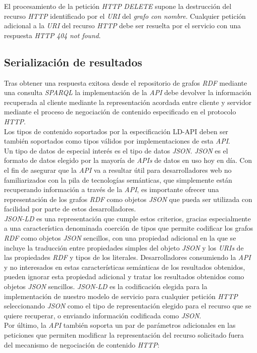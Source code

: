 El procesamiento de la petici\'on \textit{HTTP} \textit{DELETE} supone la destrucci\'on del recurso \textit{HTTP} identificado por el \textit{URI} del \textit{grafo con nombre}. Cualquier petici\'on adicional a la \textit{URI} del recurso \textit{HTTP} debe ser resuelta por el servicio con una respuesta \textit{HTTP} \textit{404 not found}.

\subsection{Serializaci\'on de resultados}

Tras obtener una respuesta exitosa desde el repositorio de grafos \textit{RDF} mediante una consulta \textit{SPARQL} la implementaci\'on de la \textit{API} debe devolver la informaci\'on recuperada al cliente mediante la representaci\'on acordada entre cliente y servidor mediante el proceso de negociaci\'on de contenido especificado en el protocolo \textit{HTTP}.\\
Los tipos de contenido soportados por la especificaci\'on LD-API deben ser tambi\'en soportados como tipos v\'alidos por implementaciones de esta \textit{API}.\\
Un tipo de datos de especial inter\'es es el tipo de datos \textit{JSON}. \textit{JSON} es el formato de datos elegido por la mayor\'ia de \textit{APIs} de datos en uso hoy en d\'ia. Con el fin de asegurar que la \textit{API} va a resultar \'util para desarrolladores web no familiarizados con la pila de tecnolog\'ias sem\'anticas, que simplemente est\'an recuperando informaci\'on a trav\'es de la \textit{API}, es importante ofrecer una representaci\'on de los grafos \textit{RDF} como objetos \textit{JSON} que pueda ser utilizada con facilidad por parte de estos desarrolladores.\\
\textit{JSON-LD} \cite{jsonld} es una representaci\'on que cumple estos criterios, gracias especialmente a una caracter\'istica denominada coerci\'on de tipos que permite codificar los grafos \textit{RDF} como objetos \textit{JSON} sencillos, con una propiedad adicional en la que se incluye la traducci\'on entre propiedades simples del objeto \textit{JSON} y los \textit{URIs} de las propiedades \textit{RDF} y tipos de los literales. Desarrolladores consumiendo la \textit{API} y no interesados en estas caracter\'isticas sem\'anticas de los resultados obtenidos, pueden ignorar esta propiedad adicional y tratar los resultados obtenidos como objetos \textit{JSON} sencillos. \textit{JSON-LD} es la codificaci\'on elegida para la implementaci\'on de nuestro modelo de servicio para cualquier petici\'on \textit{HTTP} seleccionando \textit{JSON} como el tipo de representaci\'on elegido para el recurso que se quiere recuperar, o enviando informaci\'on codificada como \textit{JSON}.\\
Por \'ultimo, la \textit{API} tambi\'en soporta un par de par\'ametros adicionales en las peticiones que permiten modificar la representaci\'on del recurso solicitado fuera del mecanismo de negociaci\'on de contenido \textit{HTTP}:

